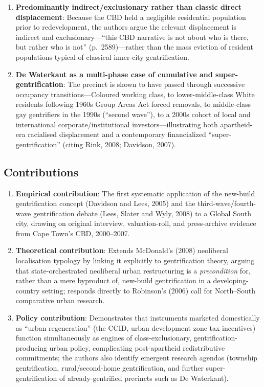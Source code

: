 \begin{enumerate}
  \item \textbf{Predominantly indirect/exclusionary rather than classic direct displacement}: Because the CBD held a negligible residential population prior to redevelopment, the authors argue the relevant displacement is indirect and exclusionary---``this CBD narrative is not about who is there, but rather who is not'' (p.~2589)---rather than the mass eviction of resident populations typical of classical inner-city gentrification.
  \item \textbf{De Waterkant as a multi-phase case of cumulative and super-gentrification}: The precinct is shown to have passed through successive occupancy transitions---Coloured working class, to lower-middle-class White residents following 1960s Group Areas Act forced removals, to middle-class gay gentrifiers in the 1990s (``second wave''), to a 2000s cohort of local and international corporate/institutional investors---illustrating both apartheid-era racialised displacement and a contemporary financialized ``super-gentrification'' (citing Rink, 2008; Davidson, 2007).
\end{enumerate}

\subsection*{Contributions}

\begin{enumerate}
  \item \textbf{Empirical contribution}: The first systematic application of the new-build gentrification concept (Davidson and Lees, 2005) and the third-wave/fourth-wave gentrification debate (Lees, Slater and Wyly, 2008) to a Global South city, drawing on original interview, valuation-roll, and press-archive evidence from Cape Town's CBD, 2000--2007.
  \item \textbf{Theoretical contribution}: Extends McDonald's (2008) neoliberal localisation typology by linking it explicitly to gentrification theory, arguing that state-orchestrated neoliberal urban restructuring is a \emph{precondition} for, rather than a mere byproduct of, new-build gentrification in a developing-country setting; responds directly to Robinson's (2006) call for North--South comparative urban research.
  \item \textbf{Policy contribution}: Demonstrates that instruments marketed domestically as ``urban regeneration'' (the CCID, urban development zone tax incentives) function simultaneously as engines of class-exclusionary, gentrification-producing urban policy, complicating post-apartheid redistributive commitments; the authors also identify emergent research agendas (township gentrification, rural/second-home gentrification, and further super-gentrification of already-gentrified precincts such as De Waterkant).
\end{enumerate}

